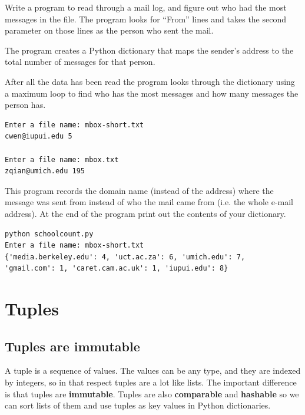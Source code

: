 \documentclass[10pt]{book}
\begin{document}
\begin{ex}
Write a program to read through a mail log, and figure 
out who had the most messages in the file.  The program looks 
for ``From'' lines and takes the second parameter on those 
lines as the person who sent the mail.

The program creates a Python dictionary that maps 
the sender's address to the total number of messages for that person.

After all the data has been read the program looks 
through the dictionary using a maximum loop
to find who has the most 
messages and how many messages the person has.

\beforeverb
\begin{verbatim}
Enter a file name: mbox-short.txt
cwen@iupui.edu 5

Enter a file name: mbox.txt
zqian@umich.edu 195
\end{verbatim}
\afterverb
\end{ex}

\begin{ex}
This program records the domain name (instead of the address) 
where the message was sent from instead of who the mail 
came from (i.e. the whole e-mail address). At the end 
of the program print out the contents of your dictionary. 

\beforeverb
\begin{verbatim}
python schoolcount.py
Enter a file name: mbox-short.txt
{'media.berkeley.edu': 4, 'uct.ac.za': 6, 'umich.edu': 7, 
'gmail.com': 1, 'caret.cam.ac.uk': 1, 'iupui.edu': 8}
\end{verbatim}
\afterverb
\end{ex}

\chapter{Tuples}
\label{tuplechap}

\section{Tuples are immutable}


A tuple is a sequence of values.  The values can be any type, and
they are indexed by integers, so in that respect tuples are a lot
like lists.  The important difference is that tuples are {\bf immutable}.
Tuples are also {\bf comparable} and {\bf hashable} so we can 
sort lists of them and use tuples as key values in Python
dictionaries.
\end{document}
